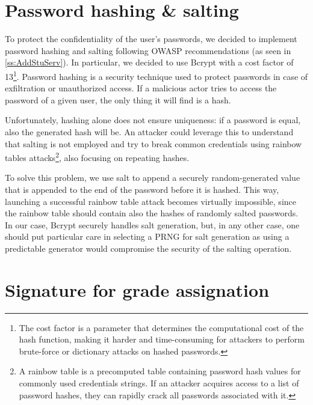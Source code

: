 \section{Password hashing \& salting}

To protect the confidentiality of the user's passwords, we decided to implement password hashing and salting following OWASP recommendations (as seen in \autoref{ss:AddStuServ}). In particular, we decided to use Bcrypt with a cost factor of 13\footnote{The cost factor is a parameter that determines the computational cost of the hash function, making it harder and time-consuming for attackers to perform brute-force or dictionary attacks on hashed passwords.}.
Password hashing is a security technique used to protect passwords in case of exfiltration or unauthorized access. If a malicious actor tries to access the password of a given user, the only thing it will find is a hash.

Unfortunately, hashing alone does not ensure uniqueness: if a password is equal, also the generated hash will be. An attacker could leverage this to understand that salting is not employed and try to break common credentials using rainbow tables attacks\footnote{A rainbow table is a precomputed table containing password hash values for commonly used credentials strings. If an attacker acquires access to a list of password hashes, they can rapidly crack all passwords associated with it.}, also focusing on repeating hashes.

To solve this problem, we use salt to append a securely random-generated value that is appended to the end of the password before it is hashed. This way, launching a successful rainbow table attack becomes virtually impossible, since the rainbow table should contain also the hashes of randomly salted passwords. In our case, Bcrypt securely handles salt generation, but, in any other case, one should put particular care in selecting a PRNG for salt generation as using a predictable generator would compromise the security of the salting operation.

\section{Signature for grade assignation}

